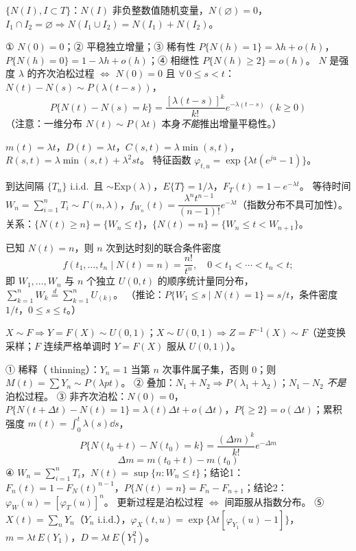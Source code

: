 \documentclass[UTF8,12pt,a4paper]{ctexart}
\begin{document}
 $\{N(I),I\subset T\}$：$N(I)$ 非负整数值随机变量，$N(\varnothing)=0$，$I_1\cap I_2=\varnothing\Rightarrow N(I_1\cup I_2)=N(I_1)+N(I_2)$。

 ① $N(0)=0$；② 平稳独立增量；③ 稀有性 $P\{N(h)=1\}=\lambda h+o(h)$，$P\{N(h)=0\}=1-\lambda h+o(h)$；④ 相继性 $P\{N(h)\ge2\}=o(h)$。
 $N$ 是强度 $\lambda$ 的齐次泊松过程 $\iff$ $N(0)=0$ 且 $\forall\,0\le s<t$：$N(t)-N(s)\sim P(\lambda(t-s))$，
$$P\{N(t)-N(s)=k\}=\frac{[\lambda(t-s)]^k}{k!}e^{-\lambda(t-s)}\ (k\ge0)$$
（注意：一维分布 $N(t)\sim P(\lambda t)$ 本身\emph{不能}推出增量平稳性。）

 $m(t)=\lambda t$，$D(t)=\lambda t$，$C(s,t)=\lambda\min(s,t)$，$R(s,t)=\lambda\min(s,t)+\lambda^2st$。
特征函数 $\varphi_{t,u}=\exp\{\lambda t(e^{ju}-1)\}$。

 到达间隔 $\{T_n\}$ i.i.d.\ 且 $\sim \mathrm{Exp}(\lambda)$，$E\{T\}=1/\lambda$，$F_T(t)=1-e^{-\lambda t}$。
 等待时间 $W_n=\sum_{i=1}^nT_i\sim\Gamma(n,\lambda)$，$f_{W_n}(t)=\dfrac{\lambda^nt^{n-1}}{(n-1)!}e^{-\lambda t}$（指数分布不具可加性）。
关系：$\{N(t)\ge n\}=\{W_n\le t\}$，$\{N(t)=n\}=\{W_n\le t<W_{n+1}\}$。

 已知 $N(t)=n$，则 $n$ 次到达时刻的联合条件密度
$$f(t_1,\dots,t_n\mid N(t)=n)=\frac{n!}{t^n},\quad 0<t_1<\cdots<t_n<t;$$
即 $W_1,\dots,W_n$ 与 $n$ 个独立 $U(0,t)$ 的顺序统计量同分布，$\sum_{k=1}^n W_k\stackrel{d}{=}\sum_{k=1}^nU_{(k)}$。
（推论：$P\{W_1\le s\mid N(t)=1\}=s/t$，条件密度 $1/t$，$0\le s\le t$。）

 $X\sim F\Rightarrow Y=F(X)\sim U(0,1)$；$X\sim U(0,1)\Rightarrow Z=F^{-1}(X)\sim F$（逆变换采样；$F$ 连续严格单调时 $Y=F(X)$ 服从 $U(0,1)$）。

① 稀释（ thinning）：$Y_n=1$ 当第 $n$ 次事件属子集，否则 $0$；则 $M(t)=\sum Y_n\sim P(\lambda pt)$。
② 叠加：$N_1+N_2\Rightarrow P(\lambda_1+\lambda_2)$；$N_1-N_2$ \emph{不是}泊松过程。
③ 非齐次泊松：$N(0)=0$，$P\{N(t+\Delta t)-N(t)=1\}=\lambda(t)\Delta t+o(\Delta t)$，$P\{\ge2\}=o(\Delta t)$；累积强度 $m(t)=\int_0^t\lambda(s)\dd s$，
$$P\{N(t_0+t)-N(t_0)=k\}=\frac{(\Delta m)^k}{k!}e^{-\Delta m}$$
$$\Delta m=m(t_0+t)-m(t_0)$$
④  $W_n=\sum_{i=1}^nT_i$，$N(t)=\sup\{n:W_n\le t\}$；结论1：$F_n(t)=1-F_N(t)^{n-1}$，$P\{N(t)=n\}=F_n-F_{n+1}$；结论2：$\varphi_W(u)=[\varphi_T(u)]^n$。
 更新过程是泊松过程 $\iff$ 间距服从指数分布。
⑤  $X(t)=\sum_{n}Y_n$（$Y_n$ i.i.d.），$\varphi_X(t,u)=\exp\{\lambda t[\varphi_{Y_1}(u)-1]\}$，$m=\lambda t\,E(Y_1)$，$D=\lambda t\,E(Y_1^2)$。
\end{document}
